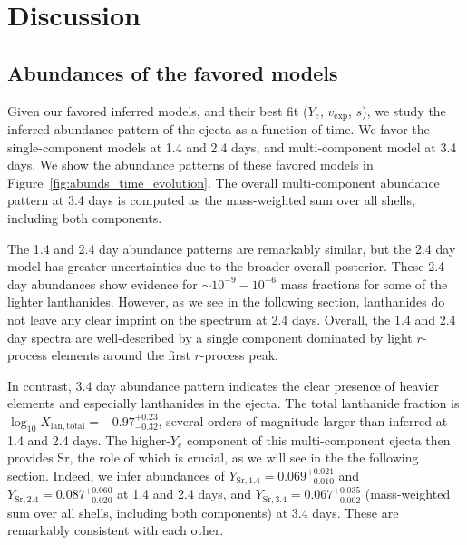 \documentclass[twocolumn,twocolappendix]{aastex63}
\begin{document}





\section{Discussion}\label{sec:disco}

\subsection{Abundances of the favored models}\label{ssc:disco-abundances}

Given our favored inferred models, and their best fit ($Y_e$, $v_{\mathrm{exp}}$, $s$), we study the inferred abundance pattern of the ejecta as a function of time. We favor the single-component models at 1.4 and 2.4 days, and multi-component model at 3.4 days. We show the abundance patterns of these favored models in Figure~\ref{fig:abunds_time_evolution}. The overall multi-component abundance pattern at 3.4 days is computed as the mass-weighted sum over all shells, including both components. 

The 1.4 and 2.4 day abundance patterns are remarkably similar, but the 2.4 day model has greater uncertainties due to the broader overall posterior. These 2.4 day abundances show evidence for $\sim 10^{-9} - 10^{-6}$ mass fractions for some of the lighter lanthanides. However, as we see in the following section, lanthanides do not leave any clear imprint on the spectrum at 2.4 days. Overall, the 1.4 and 2.4 day spectra are well-described by a single component dominated by light $r$-process elements around the first $r$-process peak.

In contrast, 3.4 day abundance pattern indicates the clear presence of heavier elements and especially lanthanides in the ejecta. The total lanthanide fraction is $\log_{10} X_{\mathrm{lan,total}} = -0.97^{+0.23}_{-0.32}$, several orders of magnitude larger than inferred at 1.4 and 2.4 days. The higher-$Y_e$ component of this multi-component ejecta then provides Sr, the role of which is crucial, as we will see in the the following section. Indeed, we infer abundances of $Y_{\mathrm{Sr},1.4} = 0.069^{+0.021}_{-0.010}$ and $Y_{\mathrm{Sr},2.4} = 0.087^{+0.060}_{-0.020}$ at 1.4 and 2.4 days, and $Y_{\mathrm{Sr},3.4} = 0.067^{+0.035}_{-0.002}$ (mass-weighted sum over all shells, including both components) at 3.4 days. These are remarkably consistent with each other.
\end{document}
